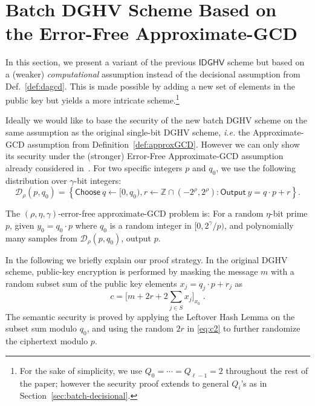 \documentclass{llncs}
\newcommand{\ie}{\textsl{i.e.}\xspace}
\newcommand{\Z}{{\mathbb Z}}
\newcommand*\Choose{\ensuremath{\mathsf{Choose}\ }}
\newcommand*\Output{\ensuremath{\mathsf{Output}\ }}
\newcommand*{\CDGHV}{\ensuremath{\mathsf{IDGHV}}}
\newcommand*\D{\ensuremath{\mathcal D}}
\begin{document}
\section{Batch DGHV Scheme Based on the Error-Free Approximate-GCD}\label{sec:batch-error-free}

In this section, we present a variant of the previous $\CDGHV$ scheme
but based on a (weaker) \emph{computational} assumption instead of the
decisional assumption from Def.~\ref{def:dagcd}. This is made possible 
by adding a new set of elements in the public key but yields a more intricate 
scheme.\footnote{For the sake of simplicity, we use
  $Q_0=\cdots=Q_{\ell-1}=2$  
throughout the rest of the paper; however the security proof extends
to general $Q_i$'s as in Section~\ref{sec:batch-decisional}.}

Ideally we would like to base the security of the new batch DGHV scheme on
the same assumption as the original single-bit DGHV scheme, \ie the
Approximate-GCD assumption from Definition~\ref{def:approxGCD}.
However we can only show its security under the
(stronger) Error-Free Approximate-GCD assumption already considered
in~\cite{vDGHV2010,CMNT2011,CNT2012}. 
For two specific
integers $p$ and $q_0$, we use the following distribution over
$\gamma$-bit integers:  
\[ \D_\rho(p,q_0) = \left\{ \Choose q\gets [0, q_0),
  r\gets \Z\cap (-2^\rho, 2^\rho) : \Output y=q\cdot p+r
  \right\}. \] 

\begin{definition} 
The $(\rho, \eta,{\gamma})$-error-free ap\-pro\-xi\-ma\-te-GCD pro\-blem
is: For a random $\eta$-bit prime $p$, given $y_0=q_0\cdot p$
where $q_0$ is a random integer in $[0,
  2^{\gamma}/p)$, and polynomially many samples from $\mathcal
  D_\rho(p,q_0)$, output $p$. 
\end{definition} 

In the following we briefly explain our proof strategy. 
 In the original DGHV scheme, public-key encryption is
performed by masking the message $m$ with a random subset sum of the
public key elements $x_j=q_j \cdot p + r_j$ as
\begin{equation}
\label{eq:c2}
c = \bigg[ m+2r+2 \sum\limits_{j \in S} x_j \bigg]_{x_0}\;.
\end{equation}
The semantic security is proved by applying the Leftover Hash Lemma on
the subset sum modulo $q_0$, and using the random $2r$ in
\eqref{eq:c2} to further 
randomize the ciphertext modulo $p$.
\end{document}
